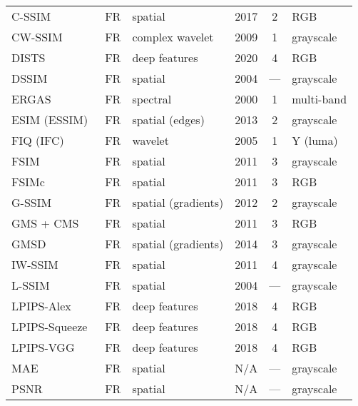 \begin{longtable}{l l l c c l}
    C-SSIM~\cite{Hassan2017CSSIM}              & FR   & spatial             & 2017 & 2    & RGB \\
    CW-SSIM~\cite{Sampat2009CWSSIM}            & FR   & complex wavelet     & 2009 & 1    & grayscale \\
    DISTS~\cite{Ding2020DISTS}                 & FR   & deep features       & 2020 & 4    & RGB \\
    DSSIM~\cite{Wang2004SSIM}                  & FR   & spatial             & 2004 & ---  & grayscale \\
    ERGAS~\cite{Ranchin2000ERGAS}              & FR   & spectral            & 2000 & 1    & multi-band \\
    ESIM (ESSIM)~\cite{Zhang2013ESSIM}         & FR   & spatial (edges)     & 2013 & 2    & grayscale \\
    FIQ (IFC)~\cite{Sheikh2005IFC}             & FR   & wavelet             & 2005 & 1    & Y (luma) \\
    FSIM~\cite{Zhang2011FSIM}                  & FR   & spatial             & 2011 & 3    & grayscale \\
    FSIMc~\cite{Zhang2011FSIM}                 & FR   & spatial             & 2011 & 3    & RGB \\
    G-SSIM~\cite{Liu2012GSSIM}                 & FR   & spatial (gradients) & 2012 & 2    & grayscale \\
    GMS + CMS~\cite{Zhang2011FSIM}             & FR   & spatial             & 2011 & 3    & RGB \\
    GMSD~\cite{Xue2014GMSD}                    & FR   & spatial (gradients) & 2014 & 3    & grayscale \\
    IW-SSIM~\cite{Li2011IWSSIM}                & FR   & spatial             & 2011 & 4    & grayscale \\
    L-SSIM~\cite{Wang2004SSIM}                 & FR   & spatial             & 2004 & ---  & grayscale \\
    LPIPS-Alex~\cite{Zhang2018LPIPS}           & FR   & deep features       & 2018 & 4    & RGB \\
    LPIPS-Squeeze~\cite{Zhang2018LPIPS}        & FR   & deep features       & 2018 & 4    & RGB \\
    LPIPS-VGG~\cite{Zhang2018LPIPS}            & FR   & deep features       & 2018 & 4    & RGB \\
    MAE~\cite{Gonzalez2008DIP}                 & FR   & spatial             & N/A  & ---  & grayscale \\
    PSNR~\cite{Gonzalez2008DIP}                & FR   & spatial             & N/A  & ---  & grayscale \\

\end{longtable}
